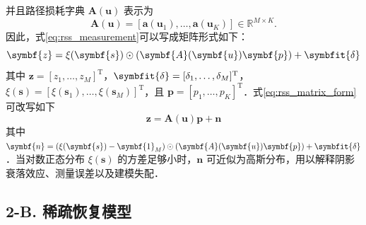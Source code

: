 \documentclass[a4paper,zihao=-4]{ctexart}
\renewcommand{\mathbf}[1]{\symbf{#1}}
\renewcommand{\boldsymbol}[1]{\symbfit{#1}}
\begin{document}
并且路径损耗字典 $\mathbf{A}(\mathbf{u})$ 表示为
\begin{equation}
	\label{eq:path_loss_dictionary}
	\mathbf{A}(\mathbf{u}) = \left[ \mathbf{a}(\mathbf{u}_1), \dots, \mathbf{a}(\mathbf{u}_K) \right] \in \mathbb{R}^{M \times K}.
\end{equation}
因此，式\eqref{eq:rss_measurement}可以写成矩阵形式如下：
\begin{equation}
	\label{eq:rss_matrix_form}
	\mathbf{z} = \xi(\mathbf{s}) \odot \left( \mathbf{A}(\mathbf{u}) \mathbf{p} \right) + \boldsymbol{\delta}
\end{equation}
其中 $\mathbf{z} = [z_1, \dots, z_M]^\mathrm{T}$，$\boldsymbol{\delta} = [\delta_1, \dots, \delta_M]^\mathrm{T}$，$\xi(\mathbf{s}) = [\xi(\mathbf{s}_1), \dots, \xi(\mathbf{s}_M)]^\mathrm{T}$，且 $\mathbf{p} = [p_1, \dots, p_K]^\mathrm{T}$．式\eqref{eq:rss_matrix_form}可改写如下
\begin{equation}
	\label{eq:rss_rewritten}
	\mathbf{z} = \mathbf{A}(\mathbf{u}) \mathbf{p} + \mathbf{n}
\end{equation}
其中 $\mathbf{n} = \left( \xi(\mathbf{s}) - \mathbf{1}_M \right) \odot \left( \mathbf{A}(\mathbf{u}) \mathbf{p} \right) + \boldsymbol{\delta}$．当对数正态分布 $\xi(\mathbf{s})$ 的方差足够小时，$\mathbf{n}$ 可近似为高斯分布，用以解释阴影衰落效应、测量误差以及建模失配．

\subsection{2-B. 稀疏恢复模型}
\end{document}
